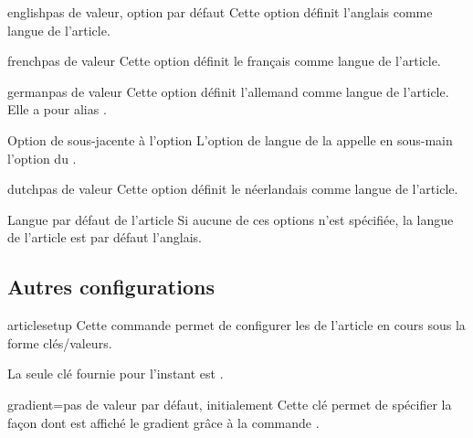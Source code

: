 \documentclass[french,nolocaltoc]{nwejmart}
\newtheorem[style=definition]{fait}
\newtheorem[title=contraventionnalisation]{ctrv}
\newtheorem[title-plural=anneaux]{anneau}
\newtheorem[title-plural=idéaux]{idéal}
\begin{document}
\begin{docKey}{english}{}{pas de valeur, option par défaut}
  Cette option définit l'anglais comme langue de l'article.
\end{docKey}
\begin{docKey}{french}{}{pas de valeur}
  Cette option définit le français comme langue de l'article.
\end{docKey}
\begin{docKey}{german}{}{pas de valeur}
  Cette option définit l'allemand comme langue de l'article. Elle a pour alias
  .
  \begin{dbremark}{Option de  sous-jacente à l'option
      \protect{}}{}
    L'option de langue  de la \nwejmauthorcl{} appelle en
    sous-main l'option  du .
  \end{dbremark}
\end{docKey}
\begin{docKey}{dutch}{}{pas de valeur}
  Cette option définit le néerlandais comme langue de l'article.
\end{docKey}

\begin{dbremark}{Langue par défaut de l'article}{}
  Si aucune de ces options n'est spécifiée, la langue de l'article est par
  défaut l'anglais.
\end{dbremark}

\subsection{Autres configurations}
\label{sec:autr-conf}

\begin{docCommand}{articlesetup}{}
  Cette commande permet de configurer les  de l'article en cours
  sous la forme clés/valeurs.

  La seule clé fournie pour l'instant est .
  \begin{docKey}{gradient}{=\textbar{}}{pas
      de valeur par défaut, initialement }
    Cette clé permet de spécifier la façon dont est affiché le gradient grâce
    à la commande .
  \end{docKey}
\end{docCommand}

\end{document}
